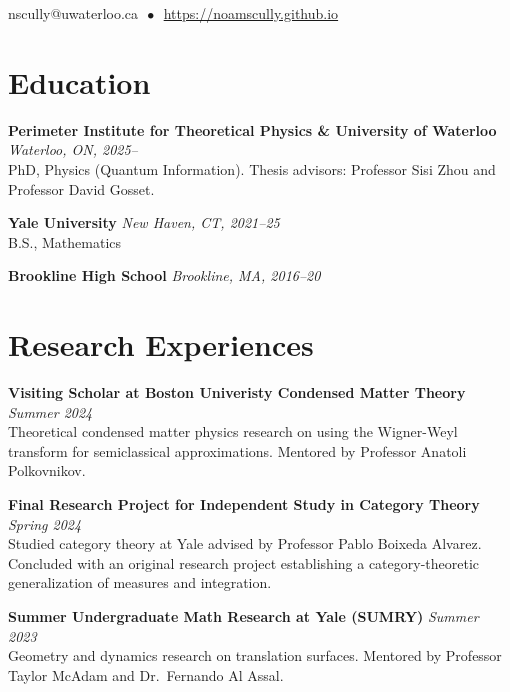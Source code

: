 \documentclass[11pt]{article}
\newcommand{\entry}[3]{
    \vspace{-.58em}
    \textbf{#1} \hfill \textit{#2} \\
    #3 \vspace{0.5em}}
\begin{document}
\begin{center}

  
  \vspace{-.1em}
  \hspace{1.8em}
  nscully@uwaterloo.ca $\, \bullet \,$ \href{https://noamscully.github.io}{https://noamscully.github.io}

\end{center}
\vspace{-0.3em}

\section*{Education}
\vspace{.58em}
\vspace{-0.1em}

\entry{Perimeter Institute for Theoretical Physics \& University of Waterloo}{Waterloo, ON, 2025--}{
PhD, Physics (Quantum Information). Thesis advisors: Professor Sisi Zhou and Professor David Gosset.
}

\entry{Yale University}{New Haven, CT, 2021--25}{
B.S., Mathematics
}

\entry{Brookline High School}{Brookline, MA, 2016--20}{
\vspace{-\baselineskip}
}


\section*{Research Experiences}
\vspace{.58em}
\vspace{-0.1em}

\entry{Visiting Scholar at Boston Univeristy Condensed Matter Theory}{Summer 2024}{
Theoretical condensed matter physics research on using the Wigner-Weyl transform for semiclassical approximations. Mentored by Professor Anatoli Polkovnikov.
}

\entry{Final Research Project for Independent Study in Category Theory}{Spring 2024}{
Studied category theory at Yale advised by Professor Pablo Boixeda Alvarez. Concluded with an original research project establishing a category-theoretic generalization of measures and integration. 
}

\entry{Summer Undergraduate Math Research at Yale (SUMRY)}{Summer 2023}{
Geometry and dynamics research on translation surfaces. Mentored by Professor Taylor McAdam and Dr.\ Fernando Al Assal. %
}
\end{document}
